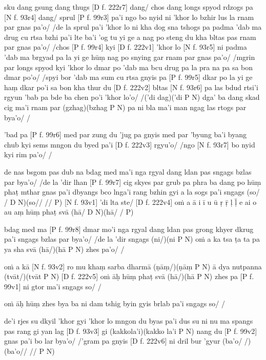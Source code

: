 \documentclass[naipra.tex]{subfiles}
\begin{document}
sku dang gsung dang thugs [D f. 222r7] dang/ chos dang longs spyod rdzogs pa [N f. 93r4] dang/ sprul [P f. 99r3] pa'i ngo bo nyid ni 'khor lo bzhir lus la rnam par gnas pa'o/ /de la sprul pa'i 'khor lo ni kha dog sna tshogs pa padma 'dab ma drug cu rtsa bzhi pa'i lte ba'i 'og tu yi ge a nag po steng du kha bltas pas rnam par gnas pa'o/ /chos [P f. 99r4] kyi [D f. 222v1] 'khor lo [N f. 93r5] ni padma 'dab ma brgyad pa la yi ge hūṃ nag po snying gar rnam par gnas pa'o/ /mgrin par longs spyod kyi 'khor lo dmar po 'dab ma bcu drug pa la pra na pa sa bon dmar po'o/ /spyi bor 'dab ma sum cu rtsa gnyis pa [P f. 99r5] dkar po la yi ge haṃ dkar po'i sa bon kha thur du [D f. 222v2] bltas [N f. 93r6] pa las bdud rtsi'i rgyun 'bab pa bde ba chen po'i 'khor lo'o/ /('di dag)('di P N) dga' ba dang skad cig ma'i rnam par (gzhag)(bzhag P N) pa ni bla ma'i man ngag las rtogs par bya'o/ /

'bad pa [P f. 99r6] med par zung du 'jug pa gnyis med par 'byung ba'i byang chub kyi sems mngon du byed pa'i [D f. 222v3] rgyu'o/ /ngo [N f. 93r7] bo nyid kyi rim pa'o/ /

de nas bsgom pas dub na bdag med ma'i nga rgyal dang ldan pas sngags bzlas par bya'o/ /de la 'dir lhan [P f. 99r7] cig skyes par grub pa phra ba dang po hūṃ phaṭ mthar gnas pa'i dbyangs bco lnga'i rang bzhin gyi a la sogs pa'i sngags (so/ / D N)(so// // P) [N f. 93v1] 'di lta ste/ [D f. 222v4] oṁ a ā i ī u ū ṛ ṝ ḷ ḹ e ai o au aṃ hūṃ phaṭ svā (hā/ D N)(hā/ / P)

bdag med ma [P f. 99r8] dmar mo'i nga rgyal dang ldan pas grong khyer dkrug pa'i sngags bzlas par bya'o/ /de la 'dir sngags (ni/)(ni P N) oṁ a ka tsa ṭa ta pa ya sha svā (hā/)(hā P N) zhes pa'o/ /

oṁ a kā [N f. 93v2] ro mu khaṃ sarba dharmā (ṇāṃ/)(ṇāṃ P N) ā dya nutpanna (tvāt/)(tvāt P N) [D f. 222v5] oṁ āḥ hūṃ phaṭ svā (hā/)(hā P N) zhes pa [P f. 99v1] ni gtor ma'i sngags so/ /

oṁ āḥ hūṃ zhes bya ba ni dam tshig byin gyis brlab pa'i sngags so/ /

de'i rjes su dkyil 'khor gyi 'khor lo mngon du byas pa'i dus su ni nu ma spangs pas rang gi yan lag [D f. 93v3] gi (kakkola'i)(kakko la'i P N) nang du [P f. 99v2] gnas pa'i bo lar bya'o/ /'gram pa gnyis [D f. 222v6] ni dril bur 'gyur (ba'o/ /)(ba'o// // P N)
\end{document}
